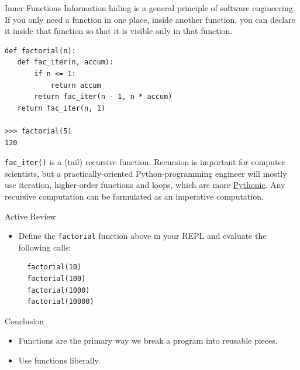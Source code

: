 \documentclass[smaller, aspectratio=1610]{beamer}
\begin{document}
\begin{frame}[label={sec:orgcc477e7},fragile]{Inner Functions}
 Information hiding is a general principle of software engineering. If you only need a function in one place, inside another function, you can declare it inside that function so that it is visible only in that function.

\lstset{language=Python,label= ,caption= ,captionpos=b,numbers=none}
\begin{lstlisting}
def factorial(n):
   def fac_iter(n, accum):
       if n <= 1:
           return accum
       return fac_iter(n - 1, n * accum)
   return fac_iter(n, 1)

>>> factorial(5)
120
\end{lstlisting}

\texttt{fac\_iter()} is a (tail) recursive function. Recursion is important for computer scientists, but a practically-oriented Python-programming engineer will mostly use iteration, higher-order functions and loops, which are more \href{http://neopythonic.blogspot.com/2009/04/tail-recursion-elimination.html}{Pythonic}. Any recursive computation can be formulated as an imperative computation.

\begin{block}{Active Review}
\begin{itemize}
\item Define the \texttt{factorial} function above in your REPL and evaluate the following calls:

\lstset{language=Python,label= ,caption= ,captionpos=b,numbers=none}
\begin{lstlisting}
  factorial(10)
  factorial(100)
  factorial(1000)
  factorial(10000)
\end{lstlisting}
\end{itemize}
\end{block}
\end{frame}

\begin{frame}[label={sec:org8f15e95}]{Conclusion}
\begin{itemize}
\item Functions are the primary way we break a program into reusable pieces.
\item Use functions liberally.
\end{itemize}
\end{frame}
\end{document}
